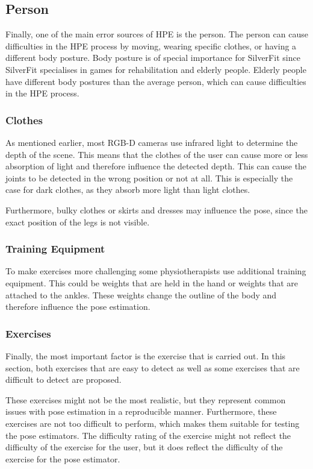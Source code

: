 \subsection{Person}

Finally, one of the main error sources of HPE is the person. The person can cause difficulties in the HPE process by moving, wearing specific clothes, or having a different body posture. Body posture is of special importance for SilverFit since SilverFit specialises in games for rehabilitation and elderly people. Elderly people have different body postures than the average person, which can cause difficulties in the HPE process.

\subsubsection{Clothes}

As mentioned earlier, most RGB-D cameras use infrared light to determine the depth of the scene. This means that the clothes of the user can cause more or less absorption of light and therefore influence the detected depth. This can cause the joints to be detected in the wrong position or not at all. This is especially the case for dark clothes, as they absorb more light than light clothes.

Furthermore, bulky clothes or skirts and dresses may influence the pose, since the exact position of the legs is not visible.

\subsubsection{Training Equipment}

To make exercises more challenging some physiotherapists use additional training equipment. This could be weights that are held in the hand or weights that are attached to the ankles. These weights change the outline of the body and therefore influence the pose estimation. 

\subsubsection{Exercises}
\label{sec:exercises}

Finally, the most important factor is the exercise that is carried out. In this section, both exercises that are easy to detect as well as some exercises that are difficult to detect are proposed.

These exercises might not be the most realistic, but they represent common issues with pose estimation in a reproducible manner. Furthermore, these exercises are not too difficult to perform, which makes them suitable for testing the pose estimators. The difficulty rating of the exercise might not reflect the difficulty of the exercise for the user, but it does reflect the difficulty of the exercise for the pose estimator.

